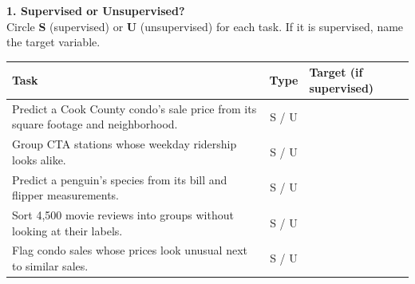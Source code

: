 \documentclass[11pt]{article}
\newcommand{\fixedblock}[2][5.7cm]{\noindent\begin{minipage}[t][#1][t]{\linewidth}\raggedright #2\end{minipage}\par}
\newcommand{\choicerow}[2]{\small #1 & \small #2 & \\ \hline}
\begin{document}
\RaggedRight

\noindent{}
\vspace{0.8em}

\fixedblock[0.29\textheight]{%
\noindent\textbf{1. Supervised or Unsupervised?}\\[0.18em]
\noindent Circle \textbf{S} (supervised) or \textbf{U} (unsupervised) for each task. If it is supervised, name the target variable.

\vspace{0.5em}
\noindent
{\setlength{\tabcolsep}{4pt}%
\renewcommand{\arraystretch}{1.3}%
\begin{tabularx}{\linewidth}{|>{\raggedright\arraybackslash}X|c|p{3.0cm}|}
  \hline
  \small Task & \small Type & \small Target (if supervised) \\ \hline
  \choicerow{Predict a Cook County condo's sale price from its square footage and neighborhood.}{S \enspace / \enspace U}
  \choicerow{Group CTA stations whose weekday ridership looks alike.}{S \enspace / \enspace U}
  \choicerow{Predict a penguin's species from its bill and flipper measurements.}{S \enspace / \enspace U}
  \choicerow{Sort 4,500 movie reviews into groups without looking at their labels.}{S \enspace / \enspace U}
  \choicerow{Flag condo sales whose prices look unusual next to similar sales.}{S \enspace / \enspace U}
\end{tabularx}}
}
\end{document}
